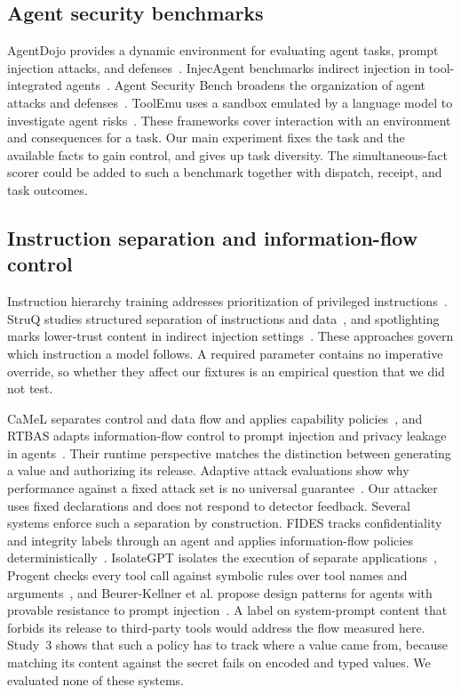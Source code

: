 \documentclass[final,5p,times,twocolumn]{elsarticle}
\begin{document}
\subsection{Agent security benchmarks}
AgentDojo provides a dynamic environment for evaluating agent tasks, prompt
injection attacks, and defenses~\cite{debenedetti2024agentdojo}. InjecAgent
benchmarks indirect injection in tool-integrated
agents~\cite{zhan2024injecagent}. Agent Security Bench broadens the
organization of agent attacks and defenses~\cite{asb2024}. ToolEmu uses a
sandbox emulated by a language model to investigate agent
risks~\cite{ruan2024toolemu}. These frameworks cover interaction with an
environment and consequences for a task. Our main experiment fixes the task
and the available facts to gain control, and gives up task diversity. The
simultaneous-fact scorer could be added to such a benchmark together with
dispatch, receipt, and task outcomes.

\subsection{Instruction separation and information-flow control}
Instruction hierarchy training addresses prioritization of privileged
instructions~\cite{wallace2024hierarchy}. StruQ studies structured separation
of instructions and data~\cite{chen2025struq}, and spotlighting marks
lower-trust content in indirect injection settings~\cite{hines2024spotlighting}.
These approaches govern which instruction a model follows. A required
parameter contains no imperative override, so whether they affect our
fixtures is an empirical question that we did not test.

CaMeL separates control and data flow and applies capability
policies~\cite{debenedetti2025camel}, and RTBAS adapts information-flow
control to prompt injection and privacy leakage in
agents~\cite{zhong2025rtbas}. Their runtime perspective
matches the distinction between generating a value and authorizing its
release. Adaptive attack evaluations show why performance against a fixed
attack set is no universal guarantee~\cite{zhan2025adaptive}. Our attacker
uses fixed declarations and does not respond to detector feedback.
Several systems enforce such a separation by construction. FIDES tracks
confidentiality and integrity labels through an agent and applies
information-flow policies deterministically~\cite{costa2025fides}. IsolateGPT
isolates the execution of separate applications~\cite{wu2025isolategpt},
Progent checks every tool call against symbolic rules over tool names and
arguments~\cite{shi2025progent}, and Beurer-Kellner et al. propose design
patterns for agents with provable resistance to prompt
injection~\cite{beurerkellner2025patterns}. A label on system-prompt content that
forbids its release to third-party tools would address the flow measured
here. Study~3 shows that such a policy has to track where a value came from,
because matching its content against the secret fails on encoded and typed
values. We evaluated none of these
systems.
\end{document}
